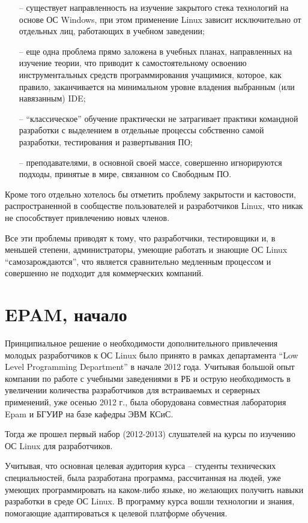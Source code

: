 \begin{itemize}
	\item[--] существует направленность на изучение закрытого стека технологий на основе ОС Windows,
		при этом применение Linux зависит исключительно от отдельных лиц, работающих в учебном заведении\cite{dkp01};
	\item[--] еще одна проблема прямо заложена в учебных планах,  направленных на изучение теории,  что приводит 
		к самостоятельному освоению инструментальных средств программирования учащимися, 
		которое,  как правило,  заканчивается на минимальном уровне владения выбранным (или навязанным) IDE;
	\item[--] ``классическое'' обучение практически не затрагивает практики командной разработки с выделением 
		в отдельные процессы собственно самой разработки,  тестирования и развертывания ПО;
	\item[--] преподавателями,  в основной своей массе,  совершенно игнорируются подходы,  принятые в мире,  связанном со Свободным ПО\cite{pg01}.
\end{itemize}

Кроме того отдельно хотелось бы отметить проблему закрытости и кастовости,  распространенной в сообществе 
пользователей и разработчиков Linux,  что никак не способствует привлечению новых членов.

Все эти проблемы приводят к тому,  что разработчики,  тестировщики и,  в меньшей степени,  администраторы,  
умеющие работать и знающие ОС Linux ``самозарождаются'',  что является сравнительно медленным процессом и 
совершенно не подходит для коммерческих компаний.

\section{EPAM, начало}

Принципиальное решение о необходимости дополнительного привлечения молодых разработчиков к ОС Linux было принято 
в рамках департамента ``Low Level Programming Department'' в начале 2012 года. Учитывая большой опыт компании по 
работе с учебными заведениями в РБ и острую необходимость в увеличении количества разработчиков для встраиваемых
и серверных применений, уже осенью 2012 г., была оборудована совместная 
лаборатория Epam и БГУИР на базе кафедры ЭВМ КСиС.

Тогда же прошел первый набор (2012-2013) слушателей на курсы по изучению ОС Linux для разработчиков.

Учитывая,  что основная целевая аудитория курса -- студенты технических специальностей,  была разработана программа,
рассчитанная на людей, уже умеющих программировать на каком-либо языке,  но желающих получить навыки разработки в 
среде ОС Linux. В программу курса вошли технологии и знания,  помогающие адаптироваться к целевой платформе обучения.

